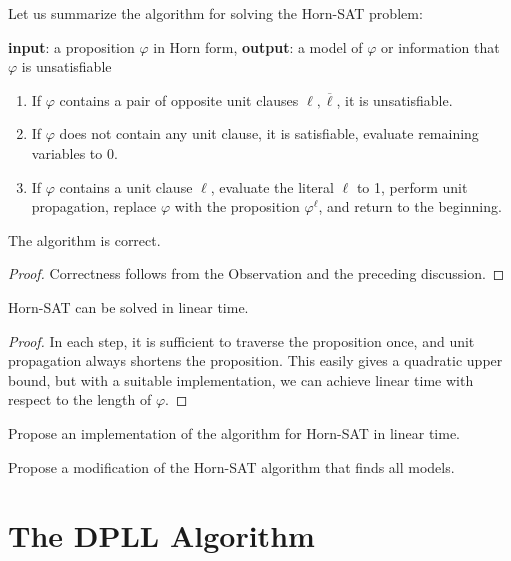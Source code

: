 Let us summarize the algorithm for solving the Horn-SAT problem:

\begin{algorithm}
\textbf{input}: a proposition $\varphi$ in Horn form, \textbf{output}: a model of $\varphi$ or information that $\varphi$ is unsatisfiable
\begin{enumerate}
    \item If $\varphi$ contains a pair of opposite unit clauses $\ell,\overline{\ell}$, it is unsatisfiable.
    \item If $\varphi$ does not contain any unit clause, it is satisfiable, evaluate remaining variables to 0.
    \item If $\varphi$ contains a unit clause $\ell$, evaluate the literal $\ell$ to 1, perform unit propagation, replace $\varphi$ with the proposition $\varphi^\ell$, and return to the beginning.
\end{enumerate}
\end{algorithm}

\begin{proposition}
The algorithm is correct.
\end{proposition}
\begin{proof}
Correctness follows from the Observation and the preceding discussion.
\end{proof}

\begin{corollary}
Horn-SAT can be solved in linear time.
\end{corollary}

\begin{proof}
In each step, it is sufficient to traverse the proposition once, and unit propagation always shortens the proposition. This easily gives a quadratic upper bound, but with a suitable implementation, we can achieve linear time with respect to the length of $\varphi$.
\end{proof}

\begin{exercise}
Propose an implementation of the algorithm for Horn-SAT in linear time.
\end{exercise}

\begin{exercise}
Propose a modification of the Horn-SAT algorithm that finds all models.
\end{exercise}


\section{The DPLL Algorithm}\label{section:DPLL}

